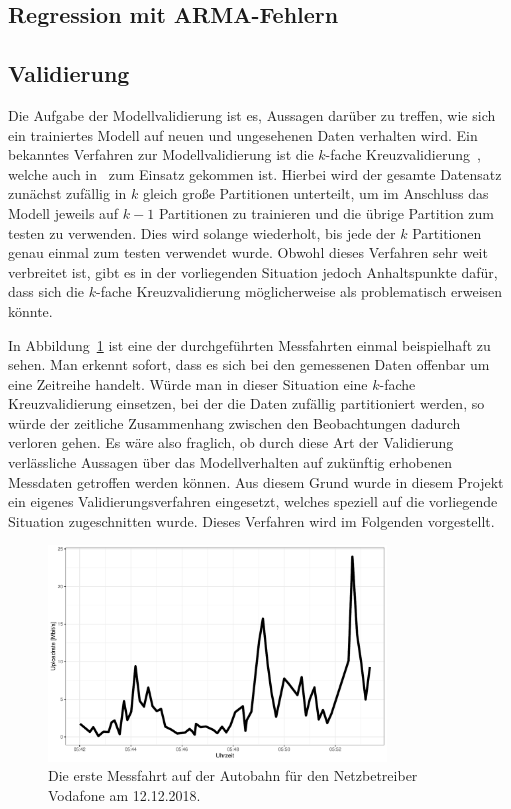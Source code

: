 \subsection{Regression mit ARMA-Fehlern}

\subsection{Validierung}

Die Aufgabe der Modellvalidierung ist es, Aussagen dar\"uber zu treffen, wie sich ein trainiertes Modell auf neuen und ungesehenen Daten
verhalten wird.
Ein bekanntes Verfahren zur Modellvalidierung ist die $k$-fache Kreuzvalidierung~\cite{elements}, welche auch in~\cite{IEEE} zum Einsatz
gekommen ist.
Hierbei wird der gesamte Datensatz zun\"achst zuf\"allig in $k$ gleich gro{\ss}e Partitionen unterteilt,
um im Anschluss das Modell jeweils auf $k-1$ Partitionen
zu trainieren und die \"ubrige Partition zum testen zu verwenden. Dies wird solange wiederholt, bis jede der
$k$ Partitionen genau einmal zum testen verwendet wurde.
Obwohl dieses Verfahren sehr weit verbreitet ist, gibt es in der vorliegenden Situation jedoch Anhaltspunkte daf\"ur,
dass sich die $k$-fache Kreuzvalidierung m\"oglicherweise als problematisch erweisen k\"onnte.

In Abbildung~\ref{fig:messfahrt-vodafone} ist eine der durchgef\"uhrten Messfahrten einmal beispielhaft zu sehen.
Man erkennt sofort, dass es sich bei den gemessenen Daten offenbar um eine Zeitreihe handelt.
W\"urde man in dieser Situation eine $k$-fache Kreuzvalidierung einsetzen, bei der die Daten zuf\"allig partitioniert werden,
so w\"urde der zeitliche Zusammenhang zwischen den Beobachtungen dadurch verloren gehen.
Es w\"are also fraglich, ob durch diese Art der Validierung verl\"assliche Aussagen \"uber das Modellverhalten auf zuk\"unftig
erhobenen Messdaten getroffen werden k\"onnen.
Aus diesem Grund wurde in diesem Projekt ein eigenes Validierungsverfahren eingesetzt, welches speziell auf die vorliegende Situation
zugeschnitten wurde.
Dieses Verfahren wird im Folgenden vorgestellt.

\begin{figure}
    \centering
    \includegraphics[width=0.8\textwidth]{abbildungen/highway_drive_vodafone}
    \caption{Die erste Messfahrt auf der Autobahn f\"ur den Netzbetreiber Vodafone am 12.12.2018.}
    \label{fig:messfahrt-vodafone}
\end{figure}